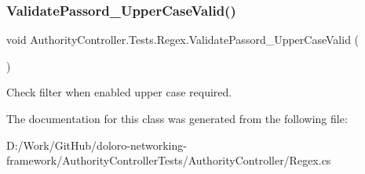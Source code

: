 \mbox{\label{class_authority_controller_1_1_tests_1_1_regex_a66cf48873a320e5d6d0a1e63b1abbb71}} 
\subsubsection{\texorpdfstring{Validate\+Passord\+\_\+\+Upper\+Case\+Valid()}{ValidatePassord\_UpperCaseValid()}}
{\footnotesize\ttfamily void Authority\+Controller.\+Tests.\+Regex.\+Validate\+Passord\+\_\+\+Upper\+Case\+Valid (\begin{DoxyParamCaption}{ }\end{DoxyParamCaption})}



Check filter when enabled upper case required. 



The documentation for this class was generated from the following file\+:\begin{DoxyCompactItemize}
\item 
D\+:/\+Work/\+Git\+Hub/doloro-\/networking-\/framework/\+Authority\+Controller\+Tests/\+Authority\+Controller/Regex.\+cs\end{DoxyCompactItemize}
